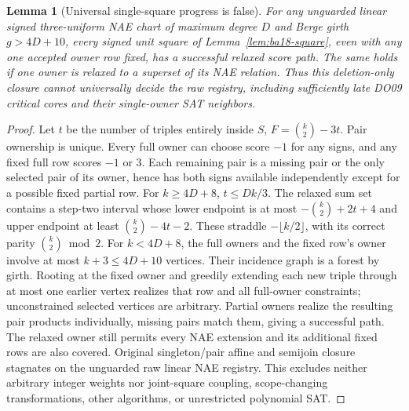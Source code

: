 \documentclass[11pt]{article}
\newtheorem{lemma}[theorem]{Lemma}
\begin{document}
\begin{lemma}[Universal single-square progress is false]\label{lem:ba18-stall}
For any unguarded linear signed three-uniform NAE chart of maximum degree $D$ and Berge girth $g>4D+10$, every signed unit square of Lemma~\ref{lem:ba18-square}, even with any one accepted owner row fixed, has a successful relaxed score path. The same holds if one owner is relaxed to a superset of its NAE relation. Thus this deletion-only closure cannot universally decide the raw registry, including sufficiently late DO09 critical cores and their single-owner SAT neighbors.
\end{lemma}
\begin{proof}
Let $t$ be the number of triples entirely inside $S$, $F=\binom{k}{2}-3t$. Pair ownership is unique. Every full owner can choose score $-1$ for any signs, and any fixed full row scores $-1$ or $3$. Each remaining pair is a missing pair or the only selected pair of its owner, hence has both signs available independently except for a possible fixed partial row. For $k\ge4D+8$, $t\le Dk/3$. The relaxed sum set contains a step-two interval whose lower endpoint is at most $-\binom{k}{2}+2t+4$ and upper endpoint at least $\binom{k}{2}-4t-2$. These straddle $-\lfloor k/2\rfloor$, with its correct parity $\binom{k}{2}\bmod2$. For $k<4D+8$, the full owners and the fixed row's owner involve at most $k+3\le4D+10$ vertices. Their incidence graph is a forest by girth. Rooting at the fixed owner and greedily extending each new triple through at most one earlier vertex realizes that row and all full-owner constraints; unconstrained selected vertices are arbitrary. Partial owners realize the resulting pair products individually, missing pairs match them, giving a successful path. The relaxed owner still permits every NAE extension and its additional fixed rows are also covered. Original singleton/pair affine and semijoin closure stagnates on the unguarded raw linear NAE registry. This excludes neither arbitrary integer weights nor joint-square coupling, scope-changing transformations, other algorithms, or unrestricted polynomial SAT.
\end{proof}
\end{document}

